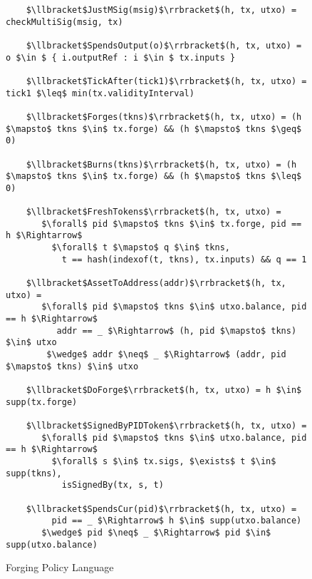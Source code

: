 \begin{figure}[t]
    \begin{lstlisting}
    $\llbracket$JustMSig(msig)$\rrbracket$(h, tx, utxo) = checkMultiSig(msig, tx)

    $\llbracket$SpendsOutput(o)$\rrbracket$(h, tx, utxo) = o $\in $ { i.outputRef : i $\in $ tx.inputs }

    $\llbracket$TickAfter(tick1)$\rrbracket$(h, tx, utxo) = tick1 $\leq$ min(tx.validityInterval)

    $\llbracket$Forges(tkns)$\rrbracket$(h, tx, utxo) = (h $\mapsto$ tkns $\in$ tx.forge) && (h $\mapsto$ tkns $\geq$ 0)

    $\llbracket$Burns(tkns)$\rrbracket$(h, tx, utxo) = (h $\mapsto$ tkns $\in$ tx.forge) && (h $\mapsto$ tkns $\leq$ 0)

    $\llbracket$FreshTokens$\rrbracket$(h, tx, utxo) =
       $\forall$ pid $\mapsto$ tkns $\in$ tx.forge, pid == h $\Rightarrow$
         $\forall$ t $\mapsto$ q $\in$ tkns,
           t == hash(indexof(t, tkns), tx.inputs) && q == 1

    $\llbracket$AssetToAddress(addr)$\rrbracket$(h, tx, utxo) =
       $\forall$ pid $\mapsto$ tkns $\in$ utxo.balance, pid == h $\Rightarrow$
          addr == _ $\Rightarrow$ (h, pid $\mapsto$ tkns) $\in$ utxo
        $\wedge$ addr $\neq$ _ $\Rightarrow$ (addr, pid $\mapsto$ tkns) $\in$ utxo

    $\llbracket$DoForge$\rrbracket$(h, tx, utxo) = h $\in$ supp(tx.forge)

    $\llbracket$SignedByPIDToken$\rrbracket$(h, tx, utxo) =
       $\forall$ pid $\mapsto$ tkns $\in$ utxo.balance, pid == h $\Rightarrow$
         $\forall$ s $\in$ tx.sigs, $\exists$ t $\in$ supp(tkns),
           isSignedBy(tx, s, t)

    $\llbracket$SpendsCur(pid)$\rrbracket$(h, tx, utxo) =
         pid == _ $\Rightarrow$ h $\in$ supp(utxo.balance)
       $\wedge$ pid $\neq$ _ $\Rightarrow$ pid $\in$ supp(utxo.balance)
    \end{lstlisting}
    \caption{Forging Policy Language}
    \label{figure:fps-language}
\end{figure}
%
